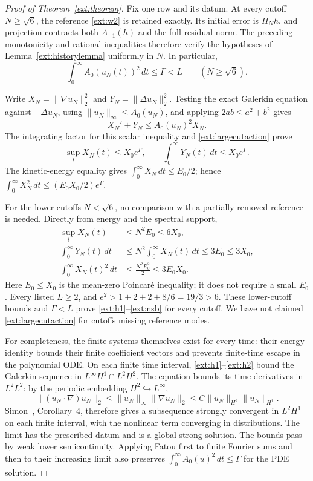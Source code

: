 \begin{proof}[Proof of Theorem~\ref{ext:theorem}]
Fix one row and its datum. At every cutoff $N\ge\sqrt6$, the reference
\eqref{ext:w2} is retained exactly. Its initial error is $\Pi_Nh$, and
projection contracts both $A_{-1}(h)$ and the full residual norm. The
preceding monotonicity and rational inequalities therefore verify the
hypotheses of Lemma~\ref{ext:historylemma} uniformly in $N$. In particular,
\begin{equation}
 \int_0^\infty A_0(u_N(t))^2\,dt\le\Gamma<L
 \qquad(N\ge\sqrt6).
 \label{ext:largecutaction}
\end{equation}

Write $X_N=\|\nabla u_N\|_2^2$ and $Y_N=\|\Delta u_N\|_2^2$.
Testing the exact Galerkin equation against $-\Delta u_N$, using
$\|u_N\|_\infty\le A_0(u_N)$, and applying $2ab\le a^2+b^2$ gives
\begin{equation}
 X_N'+Y_N\le A_0(u_N)^2X_N.
 \label{ext:enstrophy}
\end{equation}
The integrating factor for this scalar inequality and
\eqref{ext:largecutaction} prove
\[
 \sup_tX_N(t)\le X_0e^{\Gamma},\qquad
 \int_0^\infty Y_N(t)\,dt\le X_0e^{\Gamma}.
\]
The kinetic-energy equality gives $\int_0^\infty X_N\,dt\le E_0/2$;
hence $\int_0^\infty X_N^2\,dt\le(E_0X_0/2)e^{\Gamma}$.

For the lower cutoffs $N<\sqrt6$, no comparison with a partially removed
reference is needed. Directly from energy and the spectral support,
\begin{align*}
 \sup_tX_N(t)&\le N^2E_0\le6X_0,\\
 \int_0^\infty Y_N(t)\,dt
   &\le N^2\int_0^\infty X_N(t)\,dt\le3E_0\le3X_0,\\
 \int_0^\infty X_N(t)^2\,dt
   &\le\frac{N^2E_0^2}{2}\le3E_0X_0.
\end{align*}
Here $E_0\le X_0$ is the mean-zero Poincar\'e inequality; it does not
require a small $E_0$. Every listed $L\ge2$, and
$e^2>1+2+2+8/6=19/3>6$. These lower-cutoff bounds and $\Gamma<L$ prove
\eqref{ext:h1}--\eqref{ext:nsb} for every cutoff. We have not claimed
\eqref{ext:largecutaction} for cutoffs missing reference modes.

For completeness, the finite systems themselves exist for every time:
their energy identity bounds their finite coefficient vectors and prevents
finite-time escape in the polynomial ODE. On each finite time interval,
\eqref{ext:h1}--\eqref{ext:h2} bound the Galerkin sequence in
$L^\infty H^1\cap L^2H^2$. The equation bounds its time derivatives in
$L^2L^2$: by the periodic embedding $H^2\hookrightarrow L^\infty$,
\[
 \|(u_N\cdot\nabla)u_N\|_2
 \le\|u_N\|_\infty\|\nabla u_N\|_2
 \le C\|u_N\|_{H^2}\|u_N\|_{H^1}.
\]
Simon~\cite{Simon}, Corollary~4, therefore gives a subsequence strongly convergent in $L^2H^1$
on each finite interval, with the nonlinear term converging in
 distributions. The limit has the prescribed datum and is a global strong
solution. The bounds pass by weak lower semicontinuity. Applying Fatou
first to finite Fourier sums and then to their increasing limit also
preserves $\int_0^\infty A_0(u)^2\,dt\le\Gamma$ for the PDE solution.


\end{proof}
